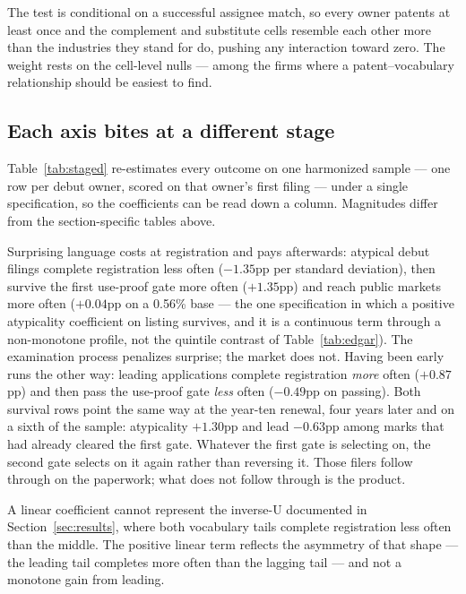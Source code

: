 \documentclass[11pt]{article}
\begin{document}
The test is conditional on a successful assignee match, so every owner patents at least once and the
complement and substitute cells resemble each other more than the industries
they stand for do, pushing any interaction toward zero. The weight rests on
the cell-level nulls --- among the firms where a patent--vocabulary
relationship should be easiest to find.

\subsection{Each axis bites at a different stage}\label{sec:staged}

Table~\ref{tab:staged} re-estimates every outcome on one harmonized sample
--- one row per debut owner, scored on that owner's first filing --- under a
single specification, so the coefficients can be read down a column. Magnitudes differ from the section-specific tables above.



Surprising language costs at registration and
pays afterwards: atypical debut filings complete registration less often
($-1.35$pp per standard deviation), then survive the first use-proof gate
more often ($+1.35$pp) and reach public markets more often ($+0.04$pp on a
0.56\% base --- the one specification in which a positive atypicality
coefficient on listing survives, and it is a continuous term through a
non-monotone profile, not the quintile contrast of Table~\ref{tab:edgar}). The examination process penalizes surprise; the market does
not. Having been early runs the other way: leading applications complete
registration \emph{more} often ($+0.87$pp) and then pass the use-proof gate
\emph{less} often ($-0.49$pp on passing). Both survival rows point the same
way at the year-ten renewal, four years later and on a sixth of the
sample: atypicality $+1.30$pp and lead $-0.63$pp among marks that had
already cleared the first gate. Whatever the first gate is selecting on,
the second gate selects on it again rather than reversing it. Those filers follow through on the paperwork;
what does not follow through is the product.

A linear coefficient cannot represent the inverse-U documented in Section~\ref{sec:results}, where
both vocabulary tails complete registration less often than the middle. The
positive linear term reflects the asymmetry of that shape --- the leading
tail completes more often than the lagging tail --- and not a monotone gain
from leading.
\end{document}
